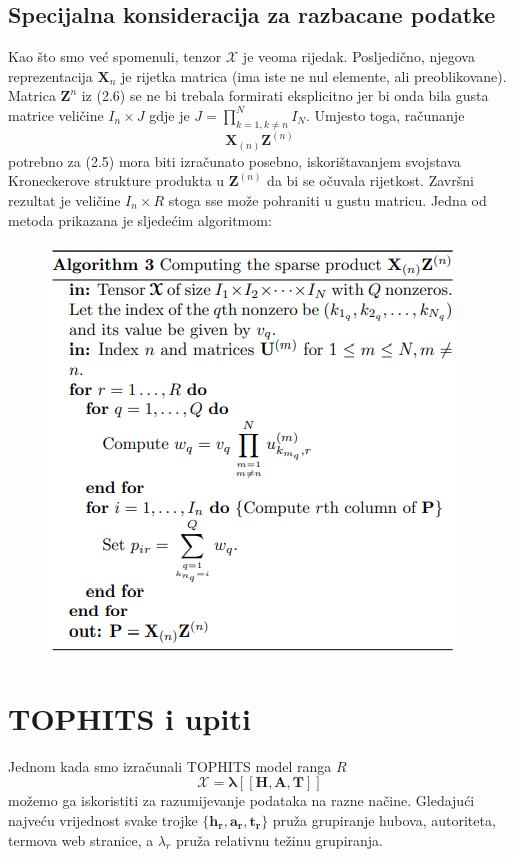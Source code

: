 \documentclass[11pt]{article}
\begin{document}
\subsection{Specijalna konsideracija za razbacane podatke}
Kao što smo već spomenuli, tenzor $\boldsymbol{\mathcal{X}}$ je veoma rijedak. Posljedično, njegova reprezentacija $\boldsymbol{X}_{n}$ je rijetka matrica (ima iste ne nul elemente, ali preoblikovane).
Matrica $\boldsymbol{Z}^{n}$ iz (2.6) se ne bi trebala formirati eksplicitno jer bi onda bila gusta matrice veličine $I_n \times J$ gdje je $J = \prod_{k = 1, k \neq n} ^{N} I_N$.
Umjesto toga, računanje
\begin{equation}
    \boldsymbol{X}_{(n)}\boldsymbol{Z}^{(n)}    
\end{equation}
potrebno za (2.5) mora biti izračunato posebno, iskorištavanjem svojstava Kroneckerove strukture produkta u $\boldsymbol{Z}^{(n)}$ da bi se očuvala rijetkost. Završni rezultat je veličine $I_n \times R$ stoga sse može pohraniti u gustu matricu.
Jedna od metoda prikazana je sljedećim algoritmom:

\begin{figure}[hbt!]
    \centering
    \includegraphics{3.alg.png}  
    \label{fig:5}
\end{figure}

\newpage
\section{TOPHITS i upiti}
Jednom kada smo izračunali TOPHITS model ranga $R$
\begin{equation}
   \boldsymbol{\mathcal{X} =  \lambda [\![ H, A, T ]\!]}
\end{equation}
možemo ga iskoristiti za razumijevanje podataka na razne načine.
Gledajući najveću vrijednost svake trojke $\{\boldsymbol{h_r}, \boldsymbol{a_r}, \boldsymbol{t_r}\}$ pruža grupiranje hubova, autoriteta, termova  web stranice, a $\lambda_r$ pruža relativnu težinu grupiranja.
\end{document}
